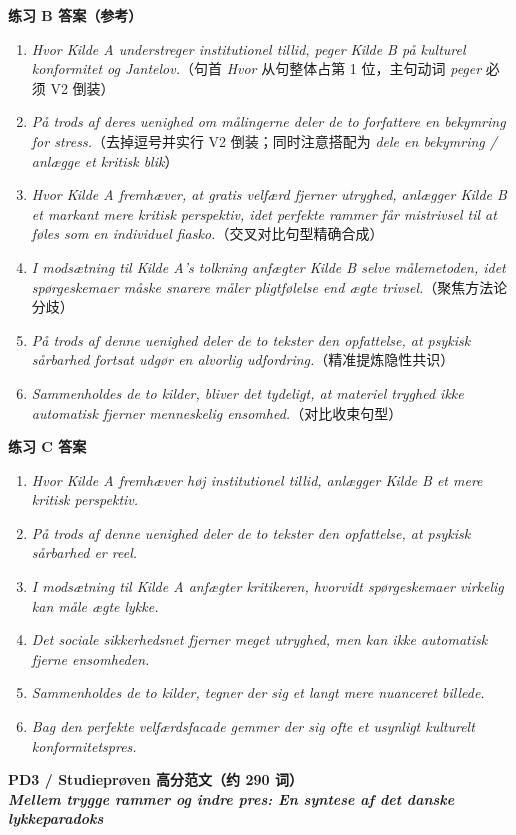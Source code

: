 \begin{answerbox}
\textbf{练习 B 答案（参考）}
\begin{enumerate}
  \item \textit{Hvor Kilde A understreger institutionel tillid, peger Kilde B på kulturel konformitet og Jantelov.}（句首 \textit{Hvor} 从句整体占第 1 位，主句动词 \textit{peger} 必须 V2 倒装）
  \item \textit{På trods af deres uenighed om målingerne deler de to forfattere en bekymring for stress.}（去掉逗号并实行 V2 倒装；同时注意搭配为 \textit{dele en bekymring / anlægge et kritisk blik}）
  \item \textit{Hvor Kilde A fremhæver, at gratis velfærd fjerner utryghed, anlægger Kilde B et markant mere kritisk perspektiv, idet perfekte rammer får mistrivsel til at føles som en individuel fiasko.}（交叉对比句型精确合成）
  \item \textit{I modsætning til Kilde A's tolkning anfægter Kilde B selve målemetoden, idet spørgeskemaer måske snarere måler pligtfølelse end ægte trivsel.}（聚焦方法论分歧）
  \item \textit{På trods af denne uenighed deler de to tekster den opfattelse, at psykisk sårbarhed fortsat udgør en alvorlig udfordring.}（精准提炼隐性共识）
  \item \textit{Sammenholdes de to kilder, bliver det tydeligt, at materiel tryghed ikke automatisk fjerner menneskelig ensomhed.}（对比收束句型）
\end{enumerate}

\textbf{练习 C 答案}
\begin{enumerate}
  \item \textit{Hvor Kilde A fremhæver høj institutionel tillid, anlægger Kilde B et mere kritisk perspektiv.}
  \item \textit{På trods af denne uenighed deler de to tekster den opfattelse, at psykisk sårbarhed er reel.}
  \item \textit{I modsætning til Kilde A anfægter kritikeren, hvorvidt spørgeskemaer virkelig kan måle ægte lykke.}
  \item \textit{Det sociale sikkerhedsnet fjerner meget utryghed, men kan ikke automatisk fjerne ensomheden.}
  \item \textit{Sammenholdes de to kilder, tegner der sig et langt mere nuanceret billede.}
  \item \textit{Bag den perfekte velfærdsfacade gemmer der sig ofte et usynligt kulturelt konformitetspres.}
\end{enumerate}

\textbf{PD3 / Studieprøven 高分范文（约 290 词）}\\
\textit{\textbf{Mellem trygge rammer og indre pres: En syntese af det danske lykkeparadoks}}


\end{answerbox}
